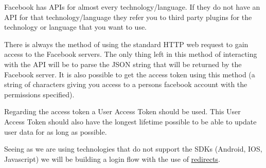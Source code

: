 \documentclass{article}
\begin{document}
			Facebook has APIs for almost every technology/language. If they do not have an API for that technology/language they refer you to third party plugins for the technology or language that you want to use.

			There is always the method of using the standard HTTP web request to gain access to the Facebook servers. The only thing left in this method of interacting with the API will be to parse the JSON string that will be returned by the Facebook server. It is also possible to get the access token using this method (a string of characters giving you access to a persons facebook account with the permissions specified).

			Regarding the access token a User Access Token should be used. This User Access Token should also have the longest lifetime possible to be able to update user data for as long as possible.

			Seeing as we are using technologies that do not support the SDKs (Android, IOS, Javascript) we will be building a login flow with the use of \href{https://developers.facebook.com/docs/facebook-login/manually-build-a-login-flow}{redirects}.\\
\end{document}
